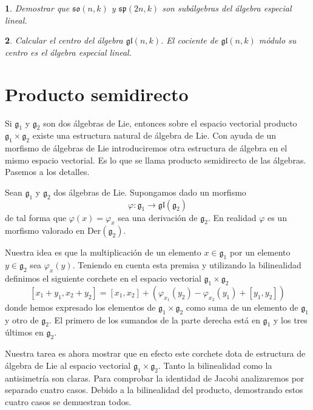 \documentclass[a4paper,draft,12pt]{article}
\newtheorem{pro1}{}%
\newenvironment{pro}{\begin{pro1} \rm} {\end{pro1}}
\newcommand{\lto}{\longrightarrow}%
\newcommand{\df}[1]{\textsf{\color{blue}#1}}
\begin{document}
\begin{pro}

Demostrar que $\mathfrak{so}(n,k)$ y $\mathfrak{sp}(2n,k)$ son subálgebras del álgebra especial lineal.

\end{pro}

\begin{pro}

Calcular el centro del álgebra $\mathfrak{gl}(n,k)$.  El cociente de $\mathfrak{gl}(n,k)$ módulo su centro es el álgebra especial lineal.

\end{pro}

\newpage

\section{Producto semidirecto}

Si $\mathfrak{g}_1$ y $\mathfrak{g}_2$ son dos álgebras de Lie, entonces sobre el espacio vectorial producto $\mathfrak{g}_1 \times \mathfrak{g}_2$ existe una estructura natural de álgebra de Lie.  Con ayuda de un morfismo de álgebras de Lie introduciremos otra estructura de álgebra en el mismo espacio vectorial.  Es lo que se llama  \df{producto semidirecto}  de las álgebras.  Pasemos a los detalles.

Sean $\mathfrak{g}_1$ y $\mathfrak{g}_2$ dos  álgebras de Lie.  Supongamos dado un morfismo 
$$
\varphi: \mathfrak{g}_1 \lto \mathfrak{gl}(\mathfrak{g}_2)
$$
de tal forma que $\varphi(x)=\varphi_x$ sea una derivación de $\mathfrak{g}_2$.  En realidad $\varphi$ es un morfismo valorado en $\mathrm{Der}(\mathfrak{g}_2)$.

Nuestra idea es que la multiplicación de un elemento $x \in \mathfrak{g}_1$ por un elemento $y \in \mathfrak{g}_2$ sea $\varphi_x(y)$.  Teniendo en cuenta esta premisa y utilizando la bilinealidad definimos el siguiente corchete en el espacio vectorial $\mathfrak{g}_1 \times \mathfrak{g}_2$
$$
[x_1+y_1, x_2+y_2]= [x_1,x_2]+(\varphi_{x_1}(y_2)- \varphi_{x_2}(y_1)+ [y_1,y_2])
$$
donde hemos expresado los elementos de $\mathfrak{g}_1 \times \mathfrak{g}_2$ como suma de un elemento de $\mathfrak{g}_1$ y otro de $\mathfrak{g}_2$.  El primero de los sumandos de la parte derecha está en $\mathfrak{g}_1$ y los tres últimos en $\mathfrak{g}_2$.

Nuestra tarea es ahora mostrar que en efecto este corchete dota de estructura de álgebra de Lie al espacio vectorial $\mathfrak{g}_1 \times \mathfrak{g}_2$.  Tanto la bilinealidad como la antisimetría son claras.  Para comprobar la identidad de Jacobi analizaremos por separado cuatro casos. Debido a la bilinealidad del producto, demostrando estos cuatro casos se demuestran todos.
\end{document}

